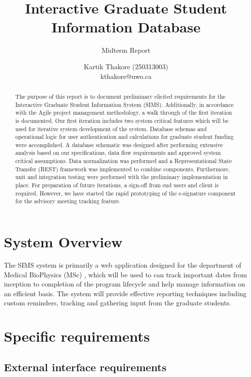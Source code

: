 \documentclass{journal}
\begin{document}

\nocite{*}
\title{Interactive Graduate Student Information Database}
\subtitle{Midterm Report} 
\author{Kartik Thakore (250313003)\\kthakore@uwo.ca}
\maketitle

\begin{abstract}
The purpose of this report is to document preliminary elicited requirements for the Interactive Graduate Student Information System (SIMS). Additionally, in accordance with the Agile project management methodology, a walk through of the first iteration is documented. Our first iteration includes two system critical features which will be used for iterative system development of the system. Database schemas and operational logic for user authentication and calculations for graduate student funding were accomplished.  A database schematic was designed after performing extensive analysis based on our specifications, data flow requirements and approved system critical assumptions. Data normalization was performed and a Representational State Transfer (REST) framework was implemented to combine components. Furthermore, unit and integration testing were performed with the preliminary implementation in place. For preparation of future iterations, a sign-off from end users and client is required. However, we have started the rapid prototyping of the e-signature component for the advisory meeting tracking feature. 
\end{abstract}

\section{System Overview}
The SIMS system is primarily a web application designed for the department of Medical BioPhysics (MSc) , which will be used to can track important dates from inception to completion of the program lifecycle and help manage information on an efficient basis. The system will provide effective reporting techniques including custom reminders, tracking and gathering input from the graduate students. 

\section{Specific requirements}
\subsection{External interface requirements}
\end{document}
